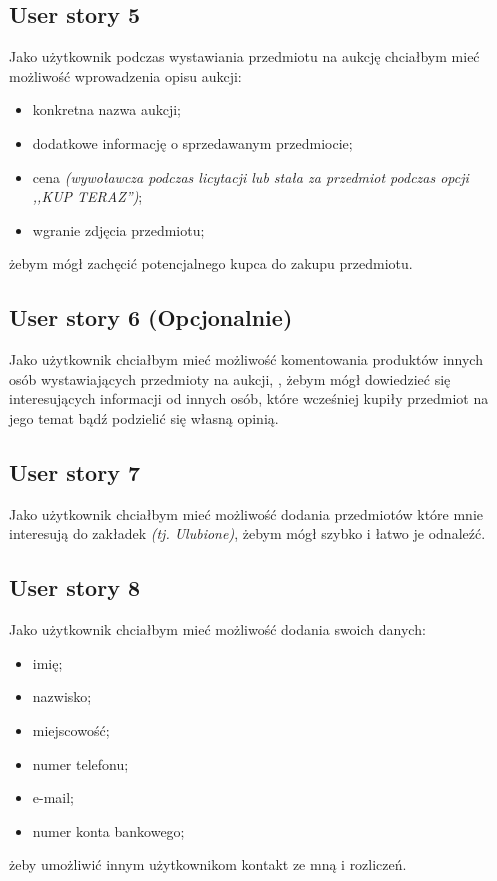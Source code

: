 \documentclass[a4paper]{article}
\begin{document}
	\subsection{User story 5}
	Jako użytkownik podczas wystawiania przedmiotu na aukcję chciałbym mieć możliwość wprowadzenia opisu aukcji:
	\begin{itemize}
		\item konkretna nazwa aukcji;
		\item dodatkowe informację o sprzedawanym przedmiocie;
		\item cena \emph{(wywoławcza podczas licytacji lub stała za przedmiot podczas opcji ,,KUP TERAZ'')};
		\item wgranie zdjęcia przedmiotu;
	\end{itemize}
	żebym mógł zachęcić potencjalnego kupca do zakupu przedmiotu.
	
	\subsection{User story 6 (Opcjonalnie)}
	Jako użytkownik chciałbym mieć możliwość komentowania produktów innych osób wystawiających przedmioty na aukcji, , żebym mógł dowiedzieć się interesujących informacji od innych osób, które wcześniej kupiły przedmiot na jego temat bądź podzielić się własną opinią. 
	
	\subsection{User story 7}
	Jako użytkownik chciałbym mieć możliwość dodania przedmiotów które mnie interesują do zakładek \emph{ (tj. Ulubione)}, żebym mógł szybko i łatwo je odnaleźć. 
	
	\subsection{User story 8}
	Jako użytkownik chciałbym mieć możliwość dodania swoich danych:
	\begin{itemize}
		\item imię;
		\item nazwisko;
		\item miejscowość;
		\item numer telefonu;
		\item e-mail;
		\item numer konta bankowego;
	\end{itemize}
	żeby umożliwić innym użytkownikom kontakt ze mną i rozliczeń.
	
\end{document}
